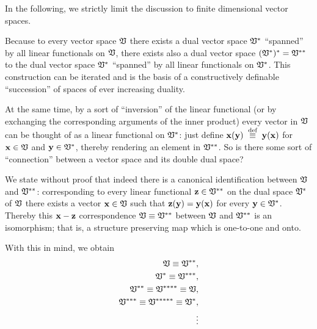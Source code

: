 In the following, we strictly limit the discussion to finite dimensional vector spaces.

Because to every vector  space ${\frak V}$
there exists a dual vector  space ${\frak V}^\ast$ ``spanned''
by all linear functionals on ${\frak V}$,
there exists also a dual vector space $({\frak V}^{\ast})^{\ast}={\frak V}^{\ast \ast}$ to the dual  vector  space ${\frak V}^\ast$
 ``spanned'' by all linear functionals on ${\frak V}^\ast$.
This construction can be iterated and is the basis of a constructively definable ``succession''
of spaces of ever increasing duality.

At the same time, by a sort of ``inversion''
of the linear functional
(or by exchanging the corresponding arguments of the inner product)
every vector in ${\frak V}$
can be thought of as a linear functional on ${\frak V}^\ast$:
just define
${\bf x}({\bf y})\stackrel{{\tiny \textrm{ def }}}{\equiv}{\bf y}({\bf x})$
for ${\bf x}\in {\frak V}$ and ${\bf y}\in {\frak V}^\ast$,
thereby rendering an element in ${\frak V}^{\ast \ast}$.
So is there some sort of ``connection'' between
a vector space and its double dual space?

We state without proof that indeed
there is a canonical identification
between ${\frak V}$ and ${\frak V}^{\ast \ast}$:
corresponding to every linear functional
${\bf z}\in  {\frak V}^{\ast \ast}$ on
the dual space  ${\frak V}^\ast$ of   ${\frak V}$
there exists a vector ${\bf x} \in  {\frak V}$
such that ${\bf z}({\bf y}) = {\bf y}({\bf x})$
for every ${\bf y} \in  {\frak V}^\ast$.
Thereby this ${\bf x}-{\bf z}$ correspondence
${\frak V} \equiv {\frak V}^{\ast \ast}$ between
${\frak V}$ and ${\frak V}^{\ast \ast}$
is an isomorphism; that is, a structure preserving map
which is one-to-one and onto.

With this in mind, we obtain
\begin{equation}
\begin{split}
{\frak V}\equiv {\frak V}^{\ast \ast},\\
{\frak V}^\ast \equiv {\frak V}^{\ast \ast \ast},\\
{\frak V}^{\ast \ast} \equiv {\frak V}^{\ast \ast \ast \ast}\equiv {\frak V},\\
{\frak V}^{\ast  \ast \ast} \equiv {\frak V}^{\ast \ast \ast  \ast \ast}\equiv {\frak V}^\ast ,\\
\qquad \vdots
\end{split}
\end{equation}



